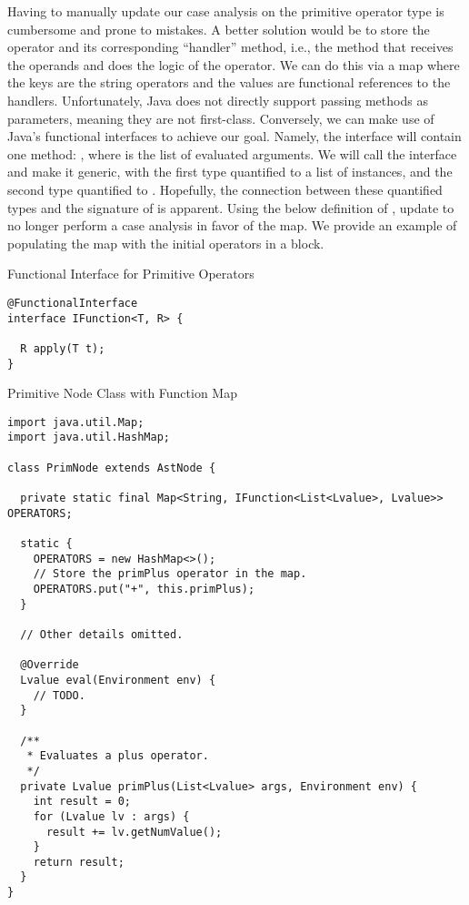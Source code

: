  Having to manually update our case analysis on the primitive operator type is cumbersome and prone to mistakes. A better solution would be to store the operator and its corresponding ``handler'' method, i.e., the method that receives the operands and does the logic of the operator. We can do this via a map where the keys are the string operators and the values are functional references to the handlers. Unfortunately, Java does not directly support passing methods as parameters, meaning they are not first-class. Conversely, we can make use of Java's functional interfaces to achieve our goal. Namely, the interface will contain one method: , where  is the list of evaluated arguments. We will call the interface  and make it generic, with the first type quantified to a list of  instances, and the second type quantified to . Hopefully, the connection between these quantified types and the signature of  is apparent. Using the below definition of , update  to no longer perform a case analysis in favor of the map. We provide an example of populating the map with the initial operators in a  block.

\begin{cl}[]{Functional Interface for Primitive Operators}
\begin{lstlisting}[language=MyJava]
@FunctionalInterface
interface IFunction<T, R> {
  
  R apply(T t);
}
\end{lstlisting}
\end{cl}

\begin{cl}{Primitive Node Class with Function Map}
\begin{lstlisting}[language=MyJava]
import java.util.Map;
import java.util.HashMap;

class PrimNode extends AstNode {
  
  private static final Map<String, IFunction<List<Lvalue>, Lvalue>> OPERATORS;
  
  static {
    OPERATORS = new HashMap<>();
    // Store the primPlus operator in the map.
    OPERATORS.put("+", this.primPlus);
  }

  // Other details omitted.

  @Override
  Lvalue eval(Environment env) {
    // TODO.
  }

  /**
   * Evaluates a plus operator.
   */
  private Lvalue primPlus(List<Lvalue> args, Environment env) {
    int result = 0;
    for (Lvalue lv : args) {
      result += lv.getNumValue();
    }
    return result;
  }
}
\end{lstlisting}
\end{cl}


